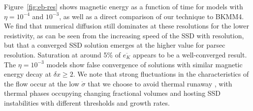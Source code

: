 \documentclass[preprint2]{aastex63}
\newcommand\SNr{\dot\sigma_{\rm sn}}
\newcommand\dx{ {\delta x}}
\newcommand\BKM{{\sf BKMM4}}
\newcommand{\fg}[1]{\textcolor{midgreen}{#1}}
\newcommand{\mm}[1]{\textcolor{mypurple}{#1}}
\begin{document}
\mm{Figure~\ref{fig:eb-res} shows magnetic energy as a function of
  time for models with $\eta = 10^{-4}$ and $10^{-3}$, as well as a
  direct comparison of our technique to \BKM. We find that numerical
diffusion still dominates at these resolutions for the lower
resistivity, as can be seen from the increasing speed of the SSD with
resolution, but that a converged SSD solution emerges at the higher 
value for parsec resolution.}
 Saturation at around 5\% of $\overline{e_K}$ appears to be a well-converged
 result.
%
\mm{The $\eta = 10^{-3}$ models show}
 false convergence
 \citep{FMA91} of solutions with similar magnetic energy decay at $\dx\geq2$.
 \fg{We note that strong fluctuations in the characteristics of the
   flow
   \mm{occur at the}
 low $\dot\sigma$ \mm{that we choose to avoid thermal runaway
   \citep{LOCBN15},} with thermal phases occupying changing fractional volumes
 \citep[e.g.][]{gatto2015} and hosting SSD instabilities with different 
 thresholds and growth rates.
 }
\end{document}
